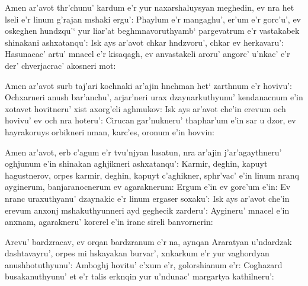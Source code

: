 \documentclass[12pt,a4paper]{article}
\begin{document}
Amen ar'avot thr'chunu' kardum e'r yur naxarshaluysyan meghedin, ev nra het
lseli e'r linum g'rajan mshaki ergu': Phaylum e'r mangaghu', er'um e'r
gorc'u', ev oskeghen hundzqu'` yur liar'at beghmnavoruthyamb` pargevatrum e'r
vastakabek shinakani ashxatanqu': Isk ays ar'avot chkar hndzvoru', chkar ev
herkavaru': Hasunacac' artu' mnacel e'r kisaqagh, ev an\-vas\-ta\-ke\-li
aroru' angorc' u'nkac' e'r der' chverjacrac' akosneri mot:

Amen ar'avot surb taj'ari kochnaki ar'ajin hnchman het` zarthnum e'r hovivu':
Ochxarneri anush bar'anchu', arjar'neri urax dzaynarkuthyunu' kendanacnum e'in
xotavet hovitneru' xist axorg'eli aghmukov: Isk ays ar'avot che'in erevum och
hovivu' ev och nra hoteru': Cirucan gar'\-nuk\-ne\-ru' thaphar'um e'in sar u
dzor, ev hayrakoruys orbikneri nman, karc'es, oronum e'in hovvin:

Amen ar'avot, erb c'agum e'r tvu'njyan lusatun, nra ar'ajin
j'a\-r'a\-gayth\-ne\-ru' oghjunum e'in shinakan aghjikneri ashxatanqu':
Karmir, deghin, kapuyt hagustnerov, orpes karmir, deghin, kapuyt c'aghikner,
sphr'vac' e'in linum nranq ayginerum, banjaranocnerum ev a\-ga\-rak\-ne\-rum:
Ergum e'in ev gorc'um e'in: Ev nranc uraxuthyanu' dzaynakic e'r linum ergaser
soxaku': Isk ays ar'avot che'in erevum anxonj msha\-ku\-thyun\-ne\-ri ayd
geghecik zarderu': Aygineru' mnacel e'in anxnam, a\-ga\-rak\-ne\-ru' korcrel
e'in iranc sireli banvornerin:

Arevu' bardzracav, ev orqan bardzranum e'r na, aynqan Araratyan u'ndardzak
dashtavayru', orpes mi hskayakan burvar', xnkarkum e'r yur vaghordyan
anushhotuthyunu': Amboghj hovitu' c'xum e'r, golorshianum e'r: Coghazard
busakanuthyunu' et e'r talis erknqin yur u'ndunac' mar\-gar\-tya kathilneru':
\end{document}

